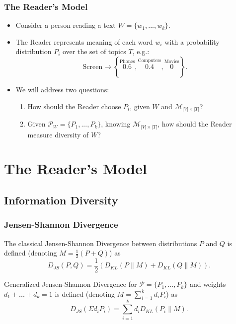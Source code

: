 \documentclass{beamer}
\newcommand\bed{\begin{Definition}}
\newcommand\eed{\end{Definition}}
\newcommand\cP{{\mathcal P}}
\newcommand\cM{{\mathcal M}}
\begin{document}
\begin{frame}
\frametitle{The Reader's Model}
\begin{itemize}
\item Consider a person reading a text $W=\{w_1,...,w_k\}$. 
\item The Reader represents meaning of each word $w_i$ with a probability
  distribution $P_{i}$ over the set of topics $T$, e.g.:
$$\textrm{Screen} \rightarrow
\left\{\overset{\textrm{Phones}}{0.6},\overset{\textrm{Computers}}{0.4},
\overset{\textrm{Movies}}{0}\right\}.$$
\item We will address two questions:
\begin{enumerate}
\item How should the Reader choose $P_{i}$, given $W$ and
  $\cM_{|V|\times|T|}$?
\item Given $\cP_{W}=\{P_{1},...,P_{k}\}$, knowing
  $\cM_{|V|\times|T|}$, how should the Reader measure diversity of $W$?
\end{enumerate}
\end{itemize}
\end{frame}

\section{The Reader's Model}

\subsection{Information Diversity}

\begin{frame}
\frametitle{Jensen-Shannon Divergence}
\bed
The classical Jensen-Shannon Divergence between distributions $P$ and
$Q$ is defined (denoting $M=\frac{1}{2}(P+Q)$) as
\[D_{JS}(P,Q) = \frac{1}{2}\left(D_{KL}(P\|M)+D_{KL}(Q\|M)\right).\]
\eed
\bed
Generalized Jensen-Shannon Divergence for  $\cP=\{P_{1},...,P_{k}\}$
and weights $d_1+...+d_k=1$ is defined (denoting $M=\sum_{i=1}^k d_i
P_i$) as
\[D_{JS}(\Sigma d_iP_i) = \sum_{i=1}^k d_i D_{KL}(P_i\|M).\] 
\eed
\end{frame}
\end{document}
